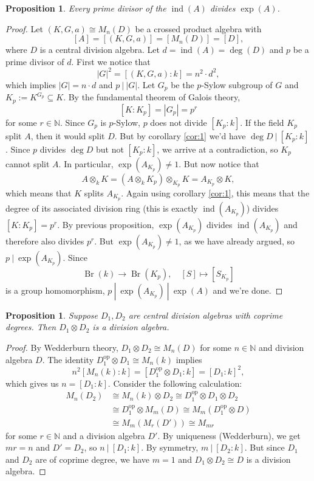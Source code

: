 \documentclass[10pt, a4paper]{article}
\newtheorem{proposition}[thm]{Proposition}
\newenvironment{noticeC}{%
  \tcolorbox[%
  notitle,
  empty,
  enhanced,  %
  breakable,
  coltext=black, 
  fontupper=\rmfamily,
  noparskip,
  sharp corners,
  boxrule=-1pt,  %
  frame hidden,
  left=7pt,  %
  right=7pt,
  top=5pt,
  bottom=5pt,
  before skip=2.5ex plus 2pt,
  after skip=2.5ex plus 2pt,
  overlay unbroken and last={%
  },
  ]}
{\endtcolorbox}
\newenvironment{myproof}%
  {\begin{noticeC}\begin{proof}}%
  {\end{proof}\end{noticeC}}
\newcommand{\N}{\mathbb {N}}
\DeclareMathOperator{\op}{op}
\DeclareMathOperator{\brauer}{Br}
\DeclareMathOperator{\ind}{ind}
\begin{document}
\begin{proposition}
  Every prime divisor of the $\ind(A)$ divides $\exp (A)$.
\end{proposition}

\begin{myproof}
  Let $(K, G, a) \cong M_n (D)$ be a crossed product algebra with 
  $$[A] = [(K, G, a)] = [M_n (D)] = [D],$$
  where $D$ is a central division algebra. Let $d = \ind (A) = \deg (D)$
  and $p$ be a prime divisor of $d$. First we notice that 
  $$|G|^2 = [(K, G, a) : k] = n^2 \cdot d^2,$$
  which implies $|G| = n \cdot d$ and $p\ |\ |G|$.
  Let $G_p$ be the $p$-Sylow subgroup of $G$ and $K_p := K^{G_p} \subseteq K$. 
  By the fundamental theorem of Galois theory, 
  $$[K: K_p] = |G_p| = p^r$$ for some $r \in \N$.
  Since $G_p$ is $p$-Sylow, $p$ does not divide $[K_p: k]$.
  If the field $K_p$ split $A$, then it would split $D$.
  But by corollary \ref{cor:1} we'd have $\deg D \ |\ [K_p : k]$.
  Since $p$ divides $\deg D$ but not $[K_p : k]$, we arrive at a contradiction,
  so $K_p$ cannot split $A$. In particular, $\exp (A_{K_p}) \neq 1$.
  But now notice that
  $$A \otimes_k K = (A \otimes_k K_p) \otimes_{K_p} K = A_{K_p} \otimes K,$$
  which means that $K$ splits $A_{K_p}$. Again using corollary \ref{cor:1}, this means that 
  the degree of its associated division ring (this is exactly $\ind (A_{K_p})$) divides $[K : K_p] = p^r$.
  By previous proposition, $\exp (A_{K_p})$ divides $\ind (A_{K_p})$ and therefore also divides $p^r$.
  But $\exp (A_{K_p}) \neq 1$, as we have already argued, so $p \ |\ \exp(A_{K_p})$.
  Since $$\brauer(k) \to \brauer(K_p),\quad [S] \mapsto [S_{K_p}]$$
  is a group homomorphism, $p\ |\ \exp(A_{K_p})\ |\ \exp (A)$ and we're done.
\end{myproof}

\begin{proposition}
  Suppose $D_1, D_2$ are central division algebras with coprime degrees.
  Then $D_1 \otimes D_2$ is a division algebra.
\end{proposition}

\begin{myproof}
  By Wedderburn theory, $D_1 \otimes D_2 \cong M_n (D)$ for some $n \in \N$ and division algebra $D$.
  The identity $D_1 ^{\op} \otimes D_1 \cong M_n (k)$ implies 
  $$n^2 [M_n (k) : k] = [D_1 ^{\op} \otimes D_1 : k] = [D_1 : k]^2,$$
  which gives us $n = [D_1 : k]$. Consider the following calculation:
  \begin{align*}
    M_n (D_2) &\cong M_n (k) \otimes D_2 \cong D_1 ^{\op} \otimes D_1 \otimes D_2\\
    &\cong D_1 ^{\op} \otimes M_m (D) \cong M_m (D_1 ^{\op} \otimes D)\\
    &\cong M_m (M_r (D')) \cong M_{mr}
  \end{align*}
  for some $r \in \N$ and a division algebra $D'$.
  By uniqueness (Wedderburn), we get $mr = n$ and $D' = D_2$, so $n \ |\ [D_1 : k]$.
  By symmetry, $m\ |\ [D_2 : k]$. But since $D_1$ and $D_2$ are of coprime degree, we have $m = 1$
  and $D_1 \otimes D_2 \cong D$ is a division algebra.
\end{myproof}
\end{document}
